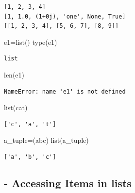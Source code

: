 \documentclass[
  a4paper,
  DIV=11,
  numbers=noendperiod]{scrreprt}
\newenvironment{Shaded}{\begin{snugshade}}{\end{snugshade}}
\newcommand{\BuiltInTok}[1]{\textcolor[rgb]{0.00,0.23,0.31}{#1}}
\newcommand{\NormalTok}[1]{\textcolor[rgb]{0.00,0.23,0.31}{#1}}
\newcommand{\OperatorTok}[1]{\textcolor[rgb]{0.37,0.37,0.37}{#1}}
\newcommand{\StringTok}[1]{\textcolor[rgb]{0.13,0.47,0.30}{#1}}
\begin{document}
\begin{verbatim}
[1, 2, 3, 4]
[1, 1.0, (1+0j), 'one', None, True]
[[1, 2, 3, 4], [5, 6, 7], [8, 9]]
\end{verbatim}

\begin{Shaded}
\begin{Highlighting}[]
\NormalTok{e1}\OperatorTok{=}\BuiltInTok{list}\NormalTok{()}
\BuiltInTok{type}\NormalTok{(e1)}
\end{Highlighting}
\end{Shaded}

\begin{verbatim}
list
\end{verbatim}

\begin{Shaded}
\begin{Highlighting}[]
\BuiltInTok{len}\NormalTok{(e1)}
\end{Highlighting}
\end{Shaded}

\begin{verbatim}
NameError: name 'e1' is not defined
\end{verbatim}

\begin{Shaded}
\begin{Highlighting}[]
\BuiltInTok{list}\NormalTok{(}\StringTok{\textquotesingle{}cat\textquotesingle{}}\NormalTok{)}
\end{Highlighting}
\end{Shaded}

\begin{verbatim}
['c', 'a', 't']
\end{verbatim}

\begin{Shaded}
\begin{Highlighting}[]
\NormalTok{a\_tuple}\OperatorTok{=}\NormalTok{(}\StringTok{\textquotesingle{}abc\textquotesingle{}}\NormalTok{)}
\BuiltInTok{list}\NormalTok{(a\_tuple)}
\end{Highlighting}
\end{Shaded}

\begin{verbatim}
['a', 'b', 'c']
\end{verbatim}

\subsection{- Accessing Items in lists}\label{accessing-items-in-lists}
\end{document}
